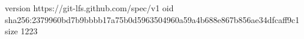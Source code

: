 version https://git-lfs.github.com/spec/v1
oid sha256:2379960bd7b9bbbb17a75b0d5963504960a59a4b688e867b856ae34dfcaff9c1
size 1223
